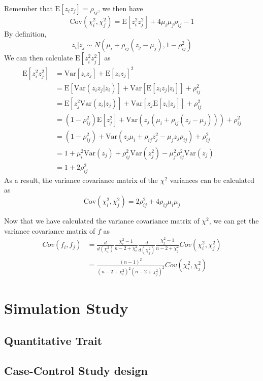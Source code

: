 \documentclass{book}
\begin{document}
			Remember that $\mathrm{E}[z_iz_j] = \rho_{ij}$, we then have
			$$
			\mathrm{Cov}(\chi_i^2, \chi_j^2)=\mathrm{E}[z_i^2z_j^2]+4\mu_i\mu_j\rho_{ij}-1
			$$
			By definition, 
			$$
				z_i|z_j\sim N(\mu_i+\rho_{ij}(z_j-\mu_j),1-\rho_{ij}^2)
			$$
			We can then calculate $\mathrm{E}[z_i^2z_j^2]$ as
			\begin{align*}
				\mathrm{E}[z_i^2z_j^2]&=\mathrm{Var}[z_iz_j]+\mathrm{E}[z_iz_j]^2\\
				&=\mathrm{E}[\mathrm{Var}(z_iz_j|z_i)]+\mathrm{Var}[\mathrm{E}[z_iz_j|z_i]]+\rho_{ij}^2\\
				&=\mathrm{E}[z_j^2\mathrm{Var}(z_i|z_j)]+\mathrm{Var}[z_j\mathrm{E}[z_i|z_j]]+\rho_{ij}^2\\
				&=(1-\rho_{ij}^2)\mathrm{E}[z_j^2]+\mathrm{Var}(z_j(\mu_i+\rho_{ij}(z_j-\mu_j)))+\rho_{ij}^2\\
				&=(1-\rho_{ij}^2)+\mathrm{Var}(z_j\mu_i+\rho_{ij}z_j^2-\mu_jz_j\rho_{ij})+\rho_{ij}^2\\
				&=1+\mu_i^2\mathrm{Var}(z_j)+\rho_{ij}^2\mathrm{Var}(z_j^2)-\mu_j^2\rho_{ij}^2\mathrm{Var}(z_j)\\
				&=1+2\rho_{ij}^2
			\end{align*}
			As a result, the variance covariance matrix of the $\chi^2$ variances can be calculated as
			$$
				\mathrm{Cov}(\chi_i^2,\chi_j^2) = 2\rho_{ij}^2+4\rho_{ij}\mu_i\mu_j
			$$

			Now that we have calculated the variance covariance matrix of $\chi^2$, we can get the variance covariance matrix of $f$ as
			\begin{align*}
			Cov(f_i,f_j) &= \frac{d}{d(\chi_i^2)}\frac{\chi_i^2-1}{n-2+\chi_i^2}\frac{d}{d(\chi_j^2)}\frac{\chi_j^2-1}{n-2+\chi_j^2}Cov(\chi_i^2,\chi_j^2) \\
			&= \frac{(n-1)^2}{(n-2+\chi_i^2)^2(n-2+\chi_j^2)^2}Cov(\chi_i^2,\chi_j^2)
			\end{align*}
		\section{Simulation Study}
			\subsection{Quantitative Trait}
			\subsection{Case-Control Study design}
\end{document}
